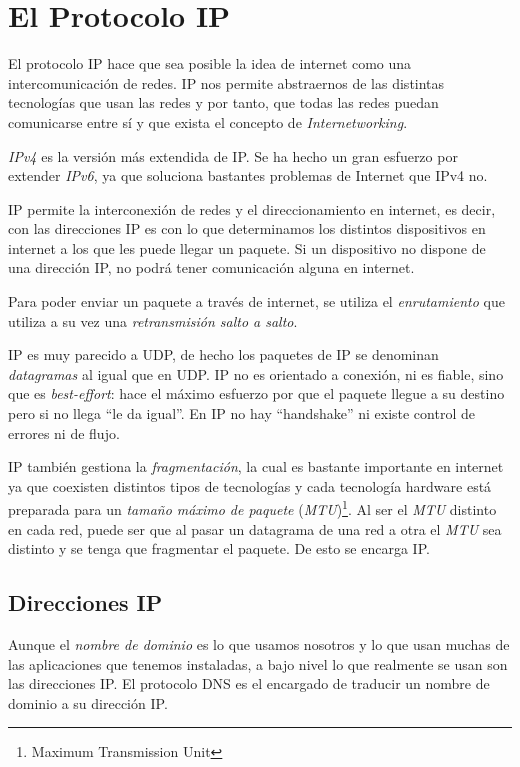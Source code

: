\documentclass[10pt,a4paper,spanish]{report}
\begin{document}
\section{\textcolor{tema4}El Protocolo IP}
El protocolo IP hace que sea posible la idea de internet como una intercomunicación de redes. IP nos permite abstraernos de las distintas tecnologías que usan las redes y por tanto, que todas las redes puedan comunicarse entre sí y que exista el concepto de \textit{\textcolor{tema4}{Internetworking}}.

\textit{\textcolor{tema4}{IPv4}} es la versión más extendida de IP. Se ha hecho un gran esfuerzo por extender \textit{\textcolor{tema4}{IPv6}}, ya que soluciona bastantes problemas de Internet que IPv4 no.

IP permite la interconexión de redes y el direccionamiento en internet, es decir, con las direcciones IP es con lo que determinamos los distintos dispositivos en internet a los que les puede llegar un paquete. Si un dispositivo no dispone de una dirección IP, no podrá tener comunicación alguna en internet.

Para poder enviar un paquete a través de internet, se utiliza el \textit{\textcolor{tema4}{enrutamiento}} que utiliza a su vez una \textit{\textcolor{tema4}{retransmisión salto a salto}}. 

IP es muy parecido a UDP, de hecho los paquetes de IP se denominan \textit{\textcolor{tema4}{datagramas}} al igual que en UDP. IP no es orientado a conexión, ni es fiable, sino que es \textit{\textcolor{tema4}{best-effort}}: hace el máximo esfuerzo por que el paquete llegue a su destino pero si no llega ``le da igual''. En IP no hay ``handshake'' ni existe control de errores ni de flujo.

IP también gestiona la \textit{\textcolor{tema4}{fragmentación}}, la cual es bastante importante en internet ya que coexisten distintos tipos de tecnologías y cada tecnología hardware está preparada para un \textit{\textcolor{tema4}{tamaño máximo de paquete}} (\textit{\textcolor{tema4}{MTU}})\footnote{Maximum Transmission Unit}. Al ser el \textit{\textcolor{tema4}{MTU}} distinto en cada red, puede ser que al pasar un datagrama de una red a otra el \textit{\textcolor{tema4}{MTU}} sea distinto y se tenga que fragmentar el paquete. De esto se encarga IP.

\subsection{\textcolor{tema4}Direcciones IP}
Aunque el \textit{\textcolor{tema4}{nombre de dominio}} es lo que usamos nosotros y lo que usan muchas de las aplicaciones que tenemos instaladas, a bajo nivel lo que realmente se usan son las direcciones IP. El protocolo DNS es el encargado de traducir un nombre de dominio a su dirección IP.
\end{document}
